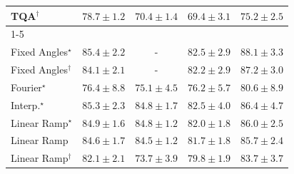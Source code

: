 \begin{tabular}{l|cccc|}
TQA$^\dagger$ & {\cellcolor[HTML]{268846}} \color[HTML]{F1F1F1} $78.7\pm 1.2$ & {\cellcolor[HTML]{77C679}} \color[HTML]{000000} $70.4\pm 1.4$ & {\cellcolor[HTML]{83CB7D}} \color[HTML]{000000} $69.4\pm 3.1$ & {\cellcolor[HTML]{3EA75A}} \color[HTML]{F1F1F1} $75.2\pm 2.5$ \\
\cline{1-5}
\multicolumn{5}{c}{\rule{0pt}{8pt}SV} \\
\midrule
Fixed Angles$^\star$ & {\cellcolor[HTML]{034C78}} \color[HTML]{F1F1F1} $85.4\pm 2.2$ & {\cellcolor[HTML]{000000}} \color[HTML]{F1F1F1} {\cellcolor{white}} \color{black} - & {\cellcolor[HTML]{046096}} \color[HTML]{F1F1F1} $82.5\pm 2.9$ & {\cellcolor[HTML]{023858}} \color[HTML]{F1F1F1} $88.1\pm 3.3$ \\
Fixed Angles$^\dagger$ & {\cellcolor[HTML]{045687}} \color[HTML]{F1F1F1} $84.1\pm 2.1$ & {\cellcolor[HTML]{000000}} \color[HTML]{F1F1F1} {\cellcolor{white}} \color{black} - & {\cellcolor[HTML]{046198}} \color[HTML]{F1F1F1} $82.2\pm 2.9$ & {\cellcolor[HTML]{023E62}} \color[HTML]{F1F1F1} $87.2\pm 3.0$ \\
Fourier$^\star$ & {\cellcolor[HTML]{2484BA}} \color[HTML]{F1F1F1} $76.4\pm 8.8$ & {\cellcolor[HTML]{328DBF}} \color[HTML]{F1F1F1} $75.1\pm 4.5$ & {\cellcolor[HTML]{2685BB}} \color[HTML]{F1F1F1} $76.2\pm 5.7$ & {\cellcolor[HTML]{0569A4}} \color[HTML]{F1F1F1} $80.6\pm 8.9$ \\
Interp.$^\star$ & {\cellcolor[HTML]{034D79}} \color[HTML]{F1F1F1} $85.3\pm 2.3$ & {\cellcolor[HTML]{03517E}} \color[HTML]{F1F1F1} $84.8\pm 1.7$ & {\cellcolor[HTML]{046096}} \color[HTML]{F1F1F1} $82.5\pm 4.0$ & {\cellcolor[HTML]{03456C}} \color[HTML]{F1F1F1} $86.4\pm 4.7$ \\
Linear Ramp$^\star$ & {\cellcolor[HTML]{03517E}} \color[HTML]{F1F1F1} $84.9\pm 1.6$ & {\cellcolor[HTML]{03517E}} \color[HTML]{F1F1F1} $84.8\pm 1.2$ & {\cellcolor[HTML]{046299}} \color[HTML]{F1F1F1} $82.0\pm 1.8$ & {\cellcolor[HTML]{034871}} \color[HTML]{F1F1F1} $86.0\pm 2.5$ \\
Linear Ramp & {\cellcolor[HTML]{045382}} \color[HTML]{F1F1F1} $84.6\pm 1.7$ & {\cellcolor[HTML]{045382}} \color[HTML]{F1F1F1} $84.5\pm 1.2$ & {\cellcolor[HTML]{04649D}} \color[HTML]{F1F1F1} $81.7\pm 1.8$ & {\cellcolor[HTML]{034A74}} \color[HTML]{F1F1F1} $85.7\pm 2.4$ \\
Linear Ramp$^\dagger$ & {\cellcolor[HTML]{046299}} \color[HTML]{F1F1F1} $82.1\pm 2.1$ & {\cellcolor[HTML]{4496C3}} \color[HTML]{F1F1F1} $73.7\pm 3.9$ & {\cellcolor[HTML]{056DAB}} \color[HTML]{F1F1F1} $79.8\pm 1.9$ & {\cellcolor[HTML]{04598C}} \color[HTML]{F1F1F1} $83.7\pm 3.7$ \\

\end{tabular}

